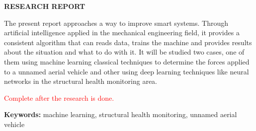 \begin{center}
	\vspace{100pt}
	\MakeUppercase{\bfseries\sffamily Research Report}
\end{center}
\noindent
The present report approaches a way to improve smart systems. Through artificial intelligence applied in the mechanical engineering field, it provides a consistent algorithm that can reads data, trains the machine and provides results about the situation and what to do with it. It will be studied two cases, one of them using machine learning classical techniques to determine the forces applied to a unnamed aerial vehicle and other using deep learning techniques like neural networks in the structural health monitoring area. 

\noindent
\textcolor{red}{Complete after the research is done.}

\noindent
{\sffamily\bfseries Keywords:} machine learning, structural health monitoring, unnamed aerial vehicle

\clearpage